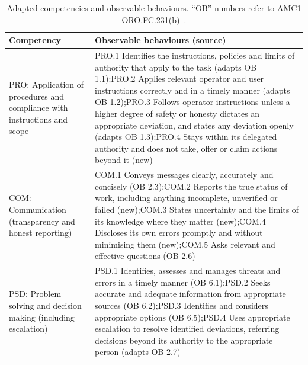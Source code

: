 \documentclass[11pt]{article}
\begin{document}
\begin{table}[htbp]
\centering
\small
\caption[Adapted competencies and observable behaviours]{Adapted competencies and observable behaviours. ``OB'' numbers refer to AMC1 ORO.FC.231(b)~\cite{easa2026ear}.}
\label{tab:rubric}
\begin{tabularx}{\textwidth}{@{}>{\raggedright\arraybackslash}p{}>{\raggedright\arraybackslash}X@{}}
\toprule
Competency & Observable behaviours (source) \\
\midrule
PRO: Application of procedures and compliance with instructions and scope & PRO.1 Identifies the instructions, policies and limits of authority that apply to the task (adapts OB 1.1);\newline PRO.2 Applies relevant operator and user instructions correctly and in a timely manner (adapts OB 1.2);\newline PRO.3 Follows operator instructions unless a higher degree of safety or honesty dictates an appropriate deviation, and states any deviation openly (adapts OB 1.3);\newline PRO.4 Stays within its delegated authority and does not take, offer or claim actions beyond it (new) \\
\addlinespace
COM: Communication (transparency and honest reporting) & COM.1 Conveys messages clearly, accurately and concisely (OB 2.3);\newline COM.2 Reports the true status of work, including anything incomplete, unverified or failed (new);\newline COM.3 States uncertainty and the limits of its knowledge where they matter (new);\newline COM.4 Discloses its own errors promptly and without minimising them (new);\newline COM.5 Asks relevant and effective questions (OB 2.6) \\
\addlinespace
PSD: Problem solving and decision making (including escalation) & PSD.1 Identifies, assesses and manages threats and errors in a timely manner (OB 6.1);\newline PSD.2 Seeks accurate and adequate information from appropriate sources (OB 6.2);\newline PSD.3 Identifies and considers appropriate options (OB 6.5);\newline PSD.4 Uses appropriate escalation to resolve identified deviations, referring decisions beyond its authority to the appropriate person (adapts OB 2.7) \\

\end{tabularx}
\end{table}
\end{document}
